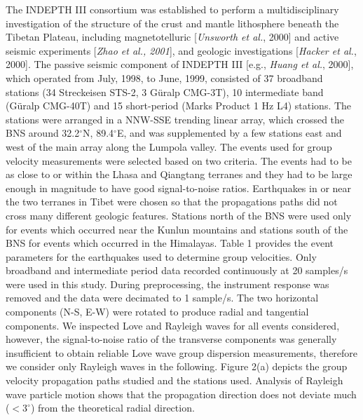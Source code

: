 \documentclass[12pt]{article}
\begin{document}
The INDEPTH III consortium was established to perform a multidisciplinary investigation of the structure of 
the crust and mantle lithosphere beneath the Tibetan Plateau,
including magnetotelluric [{\it Unsworth et al.}, 2000] and active
seismic experiments [{\it Zhao et al., 2001}], and geologic
investigations [{\it Hacker et al.}, 2000].
The passive seismic component of INDEPTH III [e.g., {\it Huang
et al.}, 2000], 
which operated from July, 1998, to June, 1999, consisted of 37 broadband
stations (34 Streckeisen STS-2, 3 G\"uralp 
CMG-3T), 10 intermediate band (G\"uralp CMG-40T) and 15 short-period (Marks Product 1 Hz L4) stations.  The 
stations were arranged in a NNW-SSE trending linear array, which crossed the BNS around 32.2$^\circ$N, 
89.4$^\circ$E, and was supplemented by a few stations east and west of the main array along the Lumpola 
valley.   The events used for group velocity measurements were selected based on two criteria.  The events had to be as close 
to or within the Lhasa and Qiangtang terranes and they had to be large enough in magnitude to have good 
signal-to-noise ratios. Earthquakes in or near the two terranes in Tibet were chosen so that the 
propagations paths did not cross many different geologic features. Stations north of the BNS were used only 
for events which occurred near the Kunlun mountains and stations south of the BNS for events which occurred 
in the Himalayas.   Table 1 provides the event parameters for the earthquakes used to determine group 
velocities.  Only broadband and intermediate period data recorded continuously at 20 samples/s were used in 
this study.  During preprocessing, the instrument response was removed and the data were decimated to 1 
sample/s.  The two horizontal components (N-S, E-W) were rotated to produce radial and tangential 
components.  
We inspected Love and Rayleigh waves for all events considered,
however, the signal-to-noise ratio of the transverse components was generally insufficient 
to obtain reliable Love wave group dispersion measurements, therefore we consider only Rayleigh
waves in the following.
Figure 2(a) depicts the group velocity propagation paths studied and the stations used.  
Analysis of Rayleigh wave particle motion shows that the propagation direction does not deviate much 
($<3^\circ$) from the theoretical radial direction. 
\end{document}
